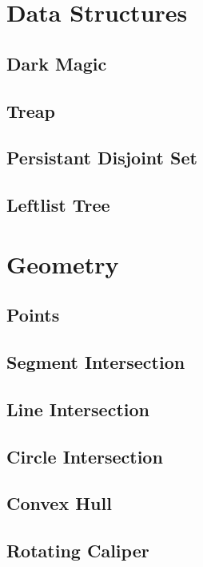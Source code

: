 \documentclass[a4paper,10pt,twocolumn,oneside]{article}
\begin{document}
\section{Data Structures}
\subsection{Dark Magic}

\subsection{Treap}

\subsection{Persistant Disjoint Set}

\subsection{Leftlist Tree}

\section{Geometry}
\subsection{Points}

\subsection{Segment Intersection}

\subsection{Line Intersection}

\subsection{Circle Intersection}

\subsection{Convex Hull}

\subsection{Rotating Caliper}

\end{document}
